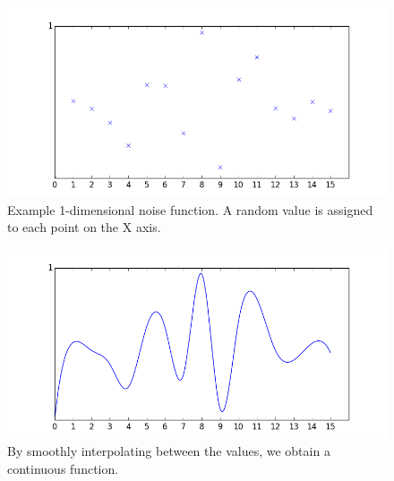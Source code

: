 \documentclass[12pt,a4paper]{article}
\begin{document}
\begin{figure}[h]
  \centering
 	\includegraphics[scale=0.5]{images/figure_2.png}
	\caption[]{Example 1-dimensional noise function. A random value is assigned to each point on the X axis.}
	\label{fig:fig4}
\end{figure}
\begin{figure}[h]
  \centering
 	\includegraphics[scale=0.5]{images/figure_1.png}
	\caption[]{By smoothly interpolating between the values, we obtain a continuous function.}
	\label{fig:fig5}
\end{figure}







\end{document}
